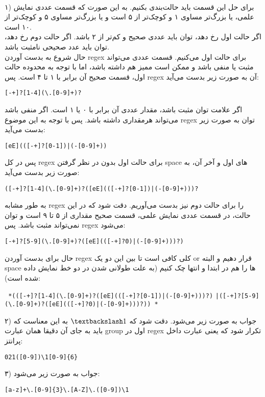 
\\
۱) برای حل این قسمت باید حالت‌بندی بکنیم. به این صورت که قسمت عددی نمایش علمی، یا بزرگ‌تر مساوی ۱ و کوچک‌تر از ۵ است و یا بزرگ‌تر مساوی ۵ و کوچک‌تر از ۱۰ است.
\\
اگر حالت اول رخ دهد، توان باید عددی صحیح و کم‌تر از ۲ باشد. اگر حالت دوم رخ دهد، توان باید عدد صحیحی نامثبت باشد.
\\
حال شروع به بدست آوردن regex برای حالت اول می‌کنیم. قسمت عددی می‌تواند مثبت یا منفی باشد و ممکن است ممیز هم داشته باشد، اما با توجه به محدوده حالت اول، قسمت صحیح آن برابر با ۱ تا ۴ است. پس regex آن به صورت زیر بدست می‌آید:
\begin{latin}
	\verb/[-+]?[1-4](\.[0-9]+)?/
\end{latin}
اگر علامت توان مثبت باشد، مقدار عددی آن برابر با ۰ یا ۱ است. اگر منفی باشد می‌تواند هرمقداری داشته باشد. پس با توجه به این موضوع regex توان به صورت زیر بدست می‌آید:
\begin{latin}
	\verb/[eE](([-+]?[0-1])|(-[0-9]+))/
\end{latin}
پس در کل regex برای حالت اول بدون در نظر گرفتن space های اول و آخر آن، به صورت زیر بدست می‌آید:
\begin{latin}
	\verb/([-+]?[1-4](\.[0-9]+)?([eE](([-+]?[0-1])|(-[0-9]+)))?/
\end{latin}
به طور مشابه regex را برای حالت دوم نیز بدست می‌آوریم. دقت شود که در این حالت، در قسمت عددی نمایش علمی، قسمت صحیح مقداری از ۵ تا ۹ است و توان نمی‌تواند مثبت باشد. پس regex می‌شود:
\begin{latin}
	\verb/[-+]?[5-9](\.[0-9]+)?([eE](([-+]?0)|(-[0-9]+)))?)/
\end{latin}
حال برای بدست آوردن regex کلی کافی است تا بین این دو یک or قرار دهیم و البته space ها را هم در ابتدا و انتها چک کنیم (به علت طولانی شدن در دو خط نمایش داده شده است):
\begin{latin}
	\verb/ *(([-+]?[1-4](\.[0-9]+)?([eE](([-+]?[0-1])|(-[0-9]+)))?)/
	\linebreak
	\verb/|([-+]?[5-9](\.[0-9]+)?([eE](([-+]?0)|(-[0-9]+)))?)) */
\end{latin}
۲) جواب به صورت زیر می‌شود. دقت شود که $\textbackslash1$ به این معناست که باید به جای آن دقیقا همان عبارت group اول در regex تکرار شود که یعنی عبارت داخل پرانتز:
\begin{latin}
	\verb/021([0-9])\1[0-9]{6}/
\end{latin}
۳) جواب به صورت زیر می‌شود:
\begin{latin}
	\verb/[a-z]+\.[0-9]{3}\.[A-Z]\.([0-9])\1/
\end{latin}
